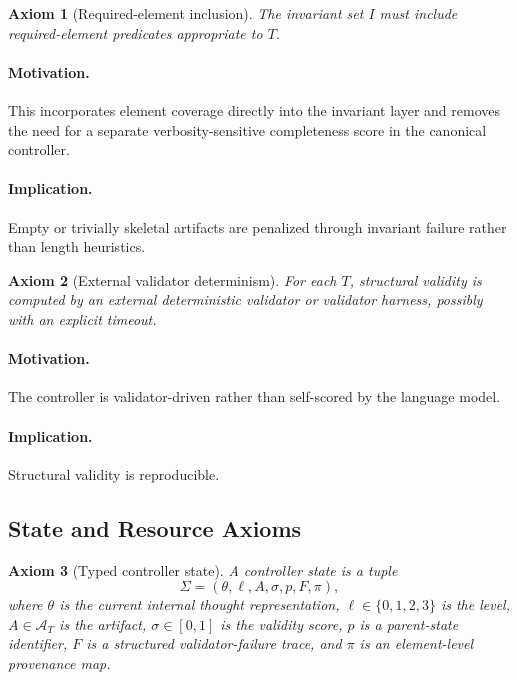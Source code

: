 \documentclass[11pt,a4paper]{article}
\numberwithin{equation}{section}
\newtheorem{axiom}{Axiom}[section]
\theoremstyle{definition}
\newcommand{\States}{\Sigma}
\newcommand{\Artifacts}{\mathcal{A}}
\begin{document}
\begin{axiom}[Required-element inclusion]
The invariant set \(I\) must include required-element predicates appropriate to \(T\).
\end{axiom}

\paragraph{Motivation.}
This incorporates element coverage directly into the invariant layer and removes the need for a separate verbosity-sensitive completeness score in the canonical controller.

\paragraph{Implication.}
Empty or trivially skeletal artifacts are penalized through invariant failure rather than length heuristics.

\begin{axiom}[External validator determinism]
For each \(T\), structural validity is computed by an external deterministic validator or validator harness, possibly with an explicit timeout.
\end{axiom}

\paragraph{Motivation.}
The controller is validator-driven rather than self-scored by the language model.

\paragraph{Implication.}
Structural validity is reproducible.

\subsection{State and Resource Axioms}

\begin{axiom}[Typed controller state]
A controller state is a tuple
\[
\States=(\theta,\ell,A,\sigma,p,F,\pi),
\]
where \(\theta\) is the current internal thought representation, \(\ell\in\{0,1,2,3\}\) is the level, \(A\in\Artifacts_T\) is the artifact, \(\sigma\in[0,1]\) is the validity score, \(p\) is a parent-state identifier, \(F\) is a structured validator-failure trace, and \(\pi\) is an element-level provenance map.
\end{axiom}
\end{document}
